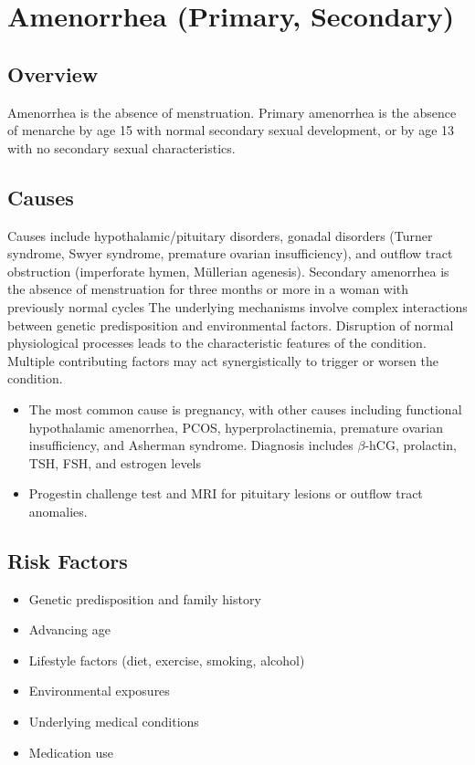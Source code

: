 \chapter{Amenorrhea (Primary, Secondary)}
\label{sec:Amenorrhea}

\section{Overview}
Amenorrhea is the absence of menstruation. Primary amenorrhea is the absence of menarche by age 15 with normal secondary sexual development, or by age 13 with no secondary sexual characteristics.
\section{Causes}
Causes include hypothalamic/pituitary disorders, gonadal disorders (Turner syndrome, Swyer syndrome, premature ovarian insufficiency), and outflow tract obstruction (imperforate hymen, M\"ullerian agenesis). Secondary amenorrhea is the absence of menstruation for three months or more in a woman with previously normal cycles The underlying mechanisms involve complex interactions between genetic predisposition and environmental factors. Disruption of normal physiological processes leads to the characteristic features of the condition. Multiple contributing factors may act synergistically to trigger or worsen the condition.

\begin{itemize}[noitemsep]
  \item The most common cause is pregnancy, with other causes including functional hypothalamic amenorrhea, PCOS, hyperprolactinemia, premature ovarian insufficiency, and Asherman syndrome. Diagnosis includes $\beta$-hCG, prolactin, TSH, FSH, and estrogen levels
  \item Progestin challenge test and MRI for pituitary lesions or outflow tract anomalies.
\end{itemize}
\section{Risk Factors}


\begin{itemize}[noitemsep]
  \item Genetic predisposition and family history
  \item Advancing age
  \item Lifestyle factors (diet, exercise, smoking, alcohol)
  \item Environmental exposures
  \item Underlying medical conditions
  \item Medication use
\end{itemize}
